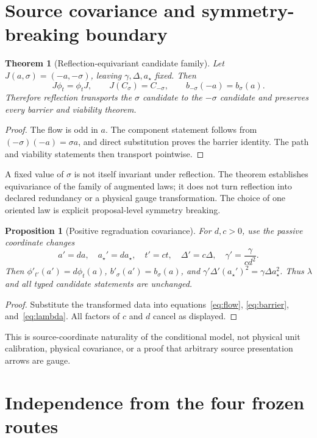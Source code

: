 \documentclass[11pt]{article}
\newtheorem{theorem}{Theorem}
\newtheorem{proposition}{Proposition}
\begin{document}
\section{Source covariance and symmetry-breaking boundary}

\begin{theorem}[Reflection-equivariant candidate family]
\label{thm:reflection}
Let $J(a,\sigma)=(-a,-\sigma)$, leaving
$\gamma,\Delta,a_\star$ fixed.  Then
\[
 J\phi_t=\phi_tJ,\qquad
 J(C_\sigma)=C_{-\sigma},\qquad
 b_{-\sigma}(-a)=b_\sigma(a).
\]
Therefore reflection transports the $\sigma$ candidate to the
$-\sigma$ candidate and preserves every barrier and viability theorem.
\end{theorem}

\begin{proof}
The flow is odd in $a$.  The component statement follows from
$(-\sigma)(-a)=\sigma a$, and direct substitution proves the barrier
identity.  The path and viability statements then transport pointwise.
\end{proof}

A fixed value of $\sigma$ is not itself invariant under reflection.  The
theorem establishes equivariance of the family of augmented laws; it does not
turn reflection into declared redundancy or a physical gauge transformation.
The choice of one oriented law is explicit proposal-level symmetry breaking.

\begin{proposition}[Positive regraduation covariance]
\label{prop:regraduation}
For $d,c>0$, use the passive coordinate changes
\[
 a'=da,\quad a_\star'=da_\star,\quad t'=ct,\quad
 \Delta'=c\Delta,\quad \gamma'=\frac{\gamma}{cd^2}.
\]
Then $\phi'_{t'}(a')=d\phi_t(a)$,
$b'_{\sigma}(a')=b_\sigma(a)$, and
$\gamma'\Delta'(a_\star')^2=\gamma\Delta a_\star^2$.
Thus $\lambda$ and all typed candidate statements are unchanged.
\end{proposition}

\begin{proof}
Substitute the transformed data into equations~\eqref{eq:flow},
\eqref{eq:barrier}, and~\eqref{eq:lambda}.  All factors of $c$ and $d$
cancel as displayed.
\end{proof}

This is source-coordinate naturality of the conditional model, not physical
unit calibration, physical covariance, or a proof that arbitrary source
presentation arrows are gauge.

\section{Independence from the four frozen routes}
\end{document}
